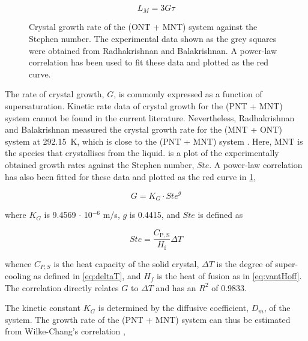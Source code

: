 \begin{equation} \label{eq:LM G tau}
    L_M = 3 G \tau
\end{equation}

\begin{figure}
    
    \caption{Crystal growth rate of the (ONT + MNT) system against the Stephen number. The experimental data shown as the grey squares were obtained from Radhakrishnan and Balakrishnan. \cite{radhakrishnan_kinetics_1999} A power-law correlation has been used to fit these data and plotted as the red curve.}
    \label{fig:ONT + MNT kinetics}
\end{figure}

The rate of crystal growth, $G$, is commonly expressed as a function of supersaturation. Kinetic rate data of crystal growth for the (PNT + MNT) system cannot be found in the current literature. Nevertheless, Radhakrishnan and Balakrishnan measured the crystal growth rate for the (MNT + ONT) system at \SI{292.15}{\K}, which is close to the (PNT + MNT) system \cite{radhakrishnan_kinetics_1999}. Here, MNT is the species that crystallises from the liquid.  is a plot of the experimentally obtained growth rates against the Stephen number, $Ste$. A power-law correlation has also been fitted for these data and plotted as the red curve in \cref{fig:ONT + MNT kinetics},

\begin{equation}  \label{eq:KG Ste g}
    G = K_G \cdot {Ste}^{g}
\end{equation}

\noindent where $K_G$ is 9.4569 $\cdot$ 10$^{-6}$ m/s, $g$ is 0.4415, and $Ste$ is defined as 

\begin{equation}
    Ste = \frac{C_{\mathrm{P,S}}}{H_{\mathrm{f}}} \Delta T
\end{equation}

\noindent whence $C_{P,S}$ is the heat capacity of the solid crystal, $\Delta T$ is the degree of super-cooling as defined in \cref{eq:deltaT}, and $H_{f}$ is the heat of fusion as in \cref{eq:vantHoff}. The correlation directly relates $G$ to $\Delta T$ and has an $R^2$ of 0.9833.

The kinetic constant $K_G$ is determined by the diffusive coefficient, $D_m$, of the system. The growth rate of the (PNT + MNT) system can thus be estimated from Wilke-Chang's correlation \cite{miyabe_estimation_2011},

